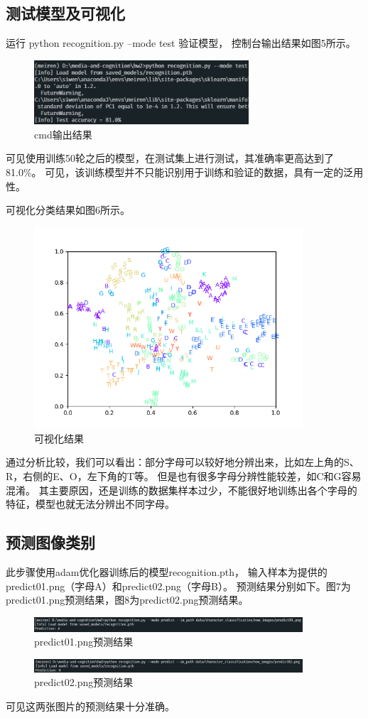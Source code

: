 \documentclass[a4paper]{article}
\begin{document}
\subsection{测试模型及可视化}
运行 python recognition.py --mode test 验证模型，
控制台输出结果如图5所示。\par
\begin{figure}[hp]
    \centering
    \includegraphics[width=8cm]{image/test_cmd.png}
    \caption{cmd输出结果}
\end{figure}
可见使用训练50轮之后的模型，在测试集上进行测试，其准确率更高达到了81.0\%。
可见，该训练模型并不只能识别用于训练和验证的数据，具有一定的泛用性。\par
可视化分类结果如图6所示。\par
\begin{figure}[hp]
    \centering
    \includegraphics[width=10cm]{image/test_figure.png}
    \caption{可视化结果}
\end{figure}
通过分析比较，我们可以看出：部分字母可以较好地分辨出来，比如左上角的S、R，右侧的E、O，左下角的T等。
但是也有很多字母分辨性能较差，如C和G容易混淆。
其主要原因，还是训练的数据集样本过少，不能很好地训练出各个字母的特征，模型也就无法分辨出不同字母。
\subsection{预测图像类别}
此步骤使用adam优化器训练后的模型recognition.pth，
输入样本为提供的predict01.png（字母A）和predict02.png（字母B）。
预测结果分别如下。图7为predict01.png预测结果，图8为predict02.png预测结果。\par
\begin{figure}[hp]
    \centering
    \includegraphics[width=10cm]{image/pred01.png}
    \caption{predict01.png预测结果}
\end{figure}
\begin{figure}[hp]
    \centering
    \includegraphics[width=10cm]{image/pred02.png}
    \caption{predict02.png预测结果}
\end{figure}
可见这两张图片的预测结果十分准确。
\end{document}
